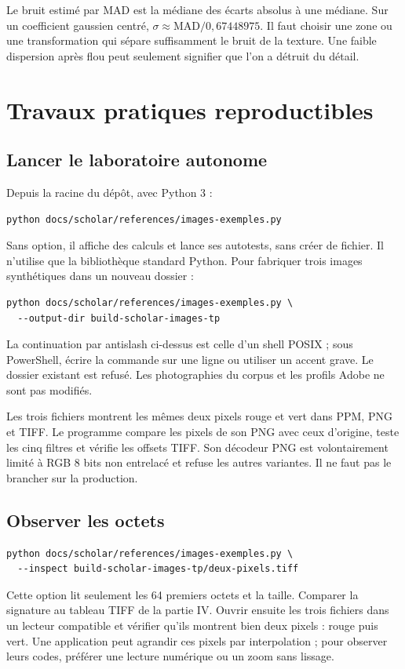 Le bruit estimé par MAD est la médiane des écarts
absolus à une médiane. Sur un coefficient gaussien
centré, $\sigma\approx\mathrm{MAD}/0{,}67448975$.
Il faut choisir une zone ou une transformation
qui sépare suffisamment le bruit de la texture.
Une faible dispersion après flou peut seulement
signifier que l'on a détruit du détail.

\section{Travaux pratiques reproductibles}
\subsection{Lancer le laboratoire autonome}
Depuis la racine du dépôt, avec Python 3 :
\begin{verbatim}
python docs/scholar/references/images-exemples.py
\end{verbatim}
Sans option, il affiche des calculs et lance ses
autotests, sans créer de fichier. Il n'utilise
que la bibliothèque standard Python. Pour fabriquer
trois images synthétiques dans un nouveau dossier :
\begin{verbatim}
python docs/scholar/references/images-exemples.py \
  --output-dir build-scholar-images-tp
\end{verbatim}
La continuation par antislash ci-dessus est celle
d'un shell POSIX ; sous PowerShell, écrire la
commande sur une ligne ou utiliser un accent grave.
Le dossier existant est refusé. Les photographies
du corpus et les profils Adobe ne sont pas modifiés.

Les trois fichiers montrent les mêmes deux pixels
rouge et vert dans PPM, PNG et TIFF. Le programme
compare les pixels de son PNG avec ceux d'origine,
teste les cinq filtres et vérifie les offsets TIFF.
Son décodeur PNG est volontairement limité à RGB
8 bits non entrelacé et refuse les autres variantes.
Il ne faut pas le brancher sur la production.

\subsection{Observer les octets}
\begin{verbatim}
python docs/scholar/references/images-exemples.py \
  --inspect build-scholar-images-tp/deux-pixels.tiff
\end{verbatim}
Cette option lit seulement les 64 premiers octets
et la taille. Comparer la signature au tableau
TIFF de la partie IV. Ouvrir ensuite les trois
fichiers dans un lecteur compatible et vérifier
qu'ils montrent bien deux pixels : rouge puis vert.
Une application peut agrandir ces pixels par
interpolation ; pour observer leurs codes, préférer
une lecture numérique ou un zoom sans lissage.

